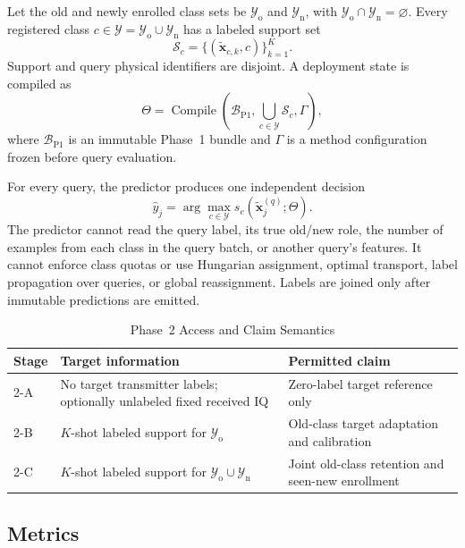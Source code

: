 \documentclass[journal]{IEEEtran}
\newcommand{\Yold}{\mathcal{Y}_{\mathrm{o}}}
\newcommand{\Ynew}{\mathcal{Y}_{\mathrm{n}}}
\begin{document}
Let the old and newly enrolled class sets be \(\Yold\) and \(\Ynew\), with \(\Yold\cap\Ynew=\varnothing\). Every registered class \(c\in\mathcal{Y}=\Yold\cup\Ynew\) has a labeled support set
\begin{equation}
\mathcal{S}_c =
\{(\widetilde{\mathbf{x}}_{c,k},c)\}_{k=1}^{K}.
\end{equation}
Support and query physical identifiers are disjoint. A deployment state is compiled as
\begin{equation}
\Theta =
\operatorname{Compile}\!\left(
\mathcal{B}_{\mathrm{P1}},
\bigcup_{c\in\mathcal{Y}}\mathcal{S}_c,
\Gamma
\right),
\label{eq:state}
\end{equation}
where \(\mathcal{B}_{\mathrm{P1}}\) is an immutable Phase~1 bundle and \(\Gamma\) is a method configuration frozen before query evaluation.

For every query, the predictor produces one independent decision
\begin{equation}
\widehat{y}_j =
\arg\max_{c\in\mathcal{Y}}
s_c(\widetilde{\mathbf{x}}^{(q)}_j;\Theta).
\label{eq:prediction}
\end{equation}
The predictor cannot read the query label, its true old/new role, the number of examples from each class in the query batch, or another query's features. It cannot enforce class quotas or use Hungarian assignment, optimal transport, label propagation over queries, or global reassignment. Labels are joined only after immutable predictions are emitted.

\begin{table}[t]
\caption{Phase~2 Access and Claim Semantics}
\label{tab:protocol}
\centering
\footnotesize
\begin{tabular}{p{}p{}p{}}
\toprule
Stage & Target information & Permitted claim \\
\midrule
2-A & No target transmitter labels; optionally unlabeled fixed received IQ & Zero-label target reference only \\
2-B & \(K\)-shot labeled support for \(\Yold\) & Old-class target adaptation and calibration \\
2-C & \(K\)-shot labeled support for \(\Yold\cup\Ynew\) & Joint old-class retention and seen-new enrollment \\
\bottomrule
\end{tabular}
\end{table}

\subsection{Metrics}
\end{document}
